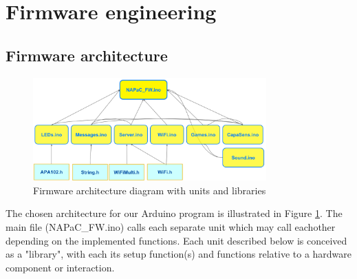\newpage
\section{Firmware engineering}
\label{sec:fw}


\subsection{Firmware architecture}

\begin{figure}[ht]
    \centering
    \includegraphics[width=0.8\textwidth]{images/FW/FW_architecture.PNG}
    \caption{Firmware architecture diagram with units and libraries}
    \label{fig:FW_architecture}
\end{figure}

The chosen architecture for our Arduino program is illustrated in Figure \ref{fig:FW_architecture}. The main file (NAPaC\_FW.ino) calls each separate unit which may call eachother depending on the implemented functions.
Each unit described below is conceived as a "library", with each its setup function(s) and functions relative to a hardware component or interaction.


